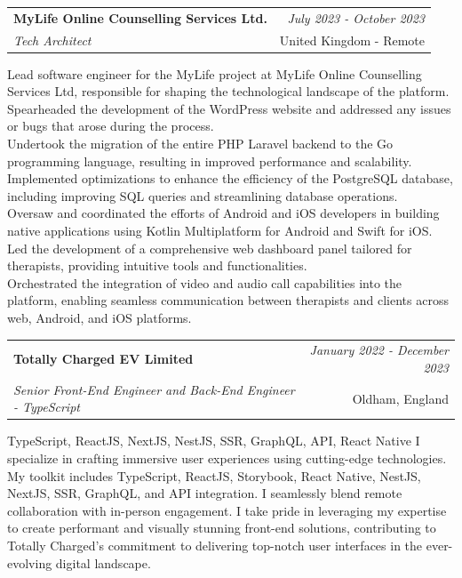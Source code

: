 \documentclass[a4paper,10pt]{article}
\makeatletter
\newcommand{\resumeSubheading}[4]{
	\vspace{0.5mm}\item
	\begin{tabular*}{0.98\textwidth}[t]{l@{\extracolsep{\fill}}r}
		\textbf{#1} & \textit{\footnotesize{#4}} \\
		\textit{\footnotesize{#3}} &  \footnotesize{#2}\\
	\end{tabular*}
	\vspace{-2.4mm}
}
\newcommand{\resumeItemListStart}{\begin{justify}\begin{itemize}[leftmargin=3ex, rightmargin=2ex, noitemsep,labelsep=1.2mm,itemsep=0mm]\small}
\newcommand{\resumeItemListEnd}{\end{itemize}\end{justify}\vspace{-2mm}}
\makeatother
\begin{document}
\vspace{-1mm}
\resumeSubheading
{MyLife Online Counselling Services Ltd.}{United Kingdom - Remote}
{Tech Architect}{July 2023 - October 2023}
\resumeItemListStart
Lead software engineer for the MyLife project at MyLife Online Counselling Services Ltd, responsible for shaping the technological landscape of the platform. \\
Spearheaded the development of the WordPress website and addressed any issues or bugs that arose during the process. \\
Undertook the migration of the entire PHP Laravel backend to the Go programming language, resulting in improved performance and scalability. \\
Implemented optimizations to enhance the efficiency of the PostgreSQL database, including improving SQL queries and streamlining database operations. \\
Oversaw and coordinated the efforts of Android and iOS developers in building native applications using Kotlin Multiplatform for Android and Swift for iOS. \\
Led the development of a comprehensive web dashboard panel tailored for therapists, providing intuitive tools and functionalities. \\
Orchestrated the integration of video and audio call capabilities into the platform, enabling seamless communication between therapists and clients across web, Android, and iOS platforms.
\resumeItemListEnd

\vspace{-1mm}
\resumeSubheading
{Totally Charged EV Limited}{Oldham, England}
{Senior Front-End Engineer and Back-End Engineer - TypeScript}{January 2022 - December 2023}
\resumeItemListStart
{TypeScript, ReactJS, NextJS, NestJS, SSR, GraphQL, API, React Native}
I specialize in crafting immersive user experiences using cutting-edge technologies. My toolkit includes TypeScript, ReactJS, Storybook, React Native, NestJS, NextJS, SSR, GraphQL, and API integration. I seamlessly blend remote collaboration with in-person engagement. I take pride in leveraging my expertise to create performant and visually stunning front-end solutions, contributing to Totally Charged's commitment to delivering top-notch user interfaces in the ever-evolving digital landscape.
\resumeItemListEnd
\end{document}
